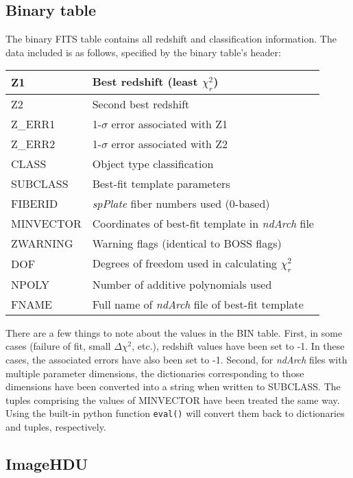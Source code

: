 \documentclass[12pt]{article}
\begin{document}
\subsection{Binary table}

The binary FITS table contains all redshift and classification information.
The data included is as follows, specified by the binary table's header:

\begin{center}
	\begin{tabular}{ | l | l | }
	\hline
	Z1 & Best redshift (least $\chi_r^2$) \\ \hline
	Z2 & Second best redshift \\ \hline
	Z\_ERR1 & 1-$\sigma$ error associated with Z1 \\ \hline
	Z\_ERR2 & 1-$\sigma$ error associated with Z2 \\ \hline
	CLASS & Object type classification \\ \hline
	SUBCLASS & Best-fit template parameters \\ \hline
	FIBERID & \textit{spPlate} fiber numbers used (0-based) \\ \hline
	MINVECTOR & Coordinates of best-fit template in \textit{ndArch} file \\ \hline
	ZWARNING & Warning flags (identical to BOSS flags) \\ \hline
	DOF & Degrees of freedom used in calculating $\chi_r^2$ \\ \hline
	NPOLY & Number of additive polynomials used \\ \hline
	FNAME & Full name of \textit{ndArch} file of best-fit template \\
	\hline
	\end{tabular}
\end{center}

There are a few things to note about the values in the BIN table.  First, in some cases
(failure of fit, small $\Delta\chi^2$, etc.), redshift values have been set to -1.  In
these cases, the associated errors have also been set to -1.  Second, for \textit{ndArch}
files with multiple parameter dimensions, the dictionaries corresponding to those dimensions
have been converted into a string when written to SUBCLASS.  The tuples comprising the
values of MINVECTOR have been treated the same way.  Using the built-in python
function \texttt{eval()} will convert them back to dictionaries and tuples, respectively.

\subsection{ImageHDU}
\end{document}
